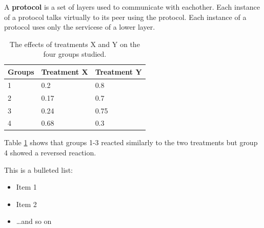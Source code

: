 \documentclass[15pt,idxtotoc,hyperref,openany]{labbook} %
\begin{document}
A {\bf  protocol } is a set of layers used to communicate with eachother.  Each instance of a protocol talks virtually to its peer using the protocol.  Each instance of a protocol uses only the servicese of a lower layer.


\begin{table}[H]
\begin{tabular}{l l l}
\toprule
\textbf{Groups} & \textbf{Treatment X} & \textbf{Treatment Y} \\
\toprule
1 & 0.2 & 0.8\\
2 & 0.17 & 0.7\\
3 & 0.24 & 0.75\\
4 & 0.68 & 0.3\\
\bottomrule
\end{tabular}
\caption{The effects of treatments X and Y on the four groups studied.}
\label{tab:treatments_xy}
\end{table}

Table \ref{tab:treatments_xy} shows that groups 1-3 reacted similarly to the two treatments but group 4 showed a reversed reaction.




This is a bulleted list:

\begin{itemize}
\item Item 1
\item Item 2
\item \ldots and so on
\end{itemize}



\lipsum[6]



\lipsum[7]


\labday{} %
\end{document}
